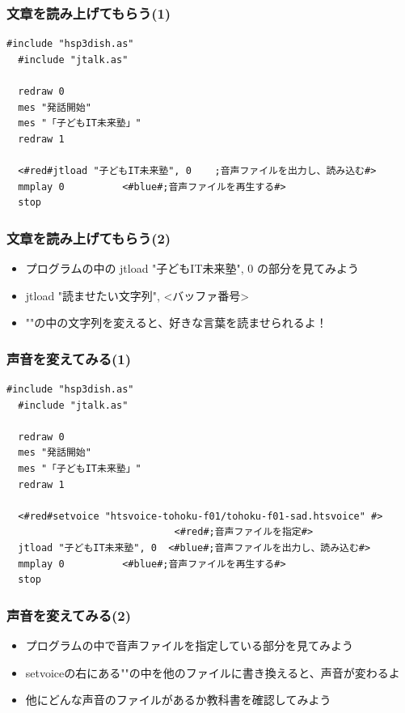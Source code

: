 \documentclass[14pt]{beamer}
\begin{document}
\begin{frame}[fragile]
  \frametitle{文章を読み上げてもらう(1)}

  \begin{lstlisting}[title=openjtalk.hsp,label=openjtalk.hsp]
  #include "hsp3dish.as"
  #include "jtalk.as"

  redraw 0
  mes "発話開始"
  mes "「子どもIT未来塾」"
  redraw 1
  
  <#red#jtload "子どもIT未来塾", 0	;音声ファイルを出力し、読み込む#>
  mmplay 0			<#blue#;音声ファイルを再生する#>
  stop
  \end{lstlisting}
\end{frame}

\begin{frame}
  \frametitle{文章を読み上げてもらう(2)}
  \begin{itemize}
    \item プログラムの中の jtload "子どもIT未来塾", 0 の部分を見てみよう
    \item jtload "読ませたい文字列", <バッファ番号>
    \item ""の中の文字列を変えると、好きな言葉を読ませられるよ！
  \end{itemize}
\end{frame}

\begin{frame}[fragile]
  \frametitle{声音を変えてみる(1)}
  \begin{lstlisting}[title=voice.hsp,label=voice.hsp]
  #include "hsp3dish.as"
  #include "jtalk.as"

  redraw 0
  mes "発話開始"
  mes "「子どもIT未来塾」"
  redraw 1
 
  <#red#setvoice "htsvoice-tohoku-f01/tohoku-f01-sad.htsvoice" #>
                             <#red#;音声ファイルを指定#>
  jtload "子どもIT未来塾", 0	<#blue#;音声ファイルを出力し、読み込む#>
  mmplay 0			<#blue#;音声ファイルを再生する#>
  stop
  \end{lstlisting}
\end{frame}

\begin{frame}
  \frametitle{声音を変えてみる(2)}
  \begin{itemize}
    \item プログラムの中で音声ファイルを指定している部分を見てみよう
    \item setvoiceの右にある""の中を他のファイルに書き換えると、声音が変わるよ
    \item 他にどんな声音のファイルがあるか教科書を確認してみよう
  \end{itemize}
\end{frame}
\end{document}
